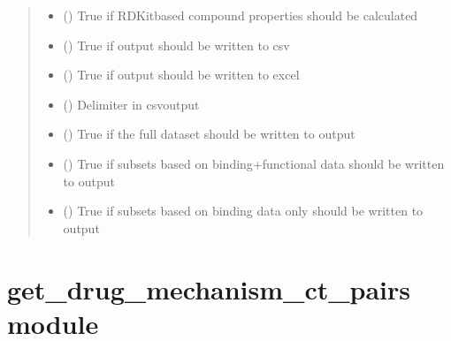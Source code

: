 \documentclass[letterpaper,10pt,english]{sphinxmanual}
\begin{document}
\begin{fulllineitems}
\begin{quote}
\begin{description}
\begin{itemize}
\item {} 
\sphinxAtStartPar
{} () \textendash{} True if RDKit\sphinxhyphen{}based compound properties should be calculated

\item {} 
\sphinxAtStartPar
{} () \textendash{} True if output should be written to csv

\item {} 
\sphinxAtStartPar
{} () \textendash{} True if output should be written to excel

\item {} 
\sphinxAtStartPar
{} () \textendash{} Delimiter in csv\sphinxhyphen{}output

\item {} 
\sphinxAtStartPar
{} () \textendash{} True if the full dataset should be written to output

\item {} 
\sphinxAtStartPar
{} () \textendash{} True if subsets based on binding+functional data should be written to output

\item {} 
\sphinxAtStartPar
{} () \textendash{} True if subsets based on binding data only should be written to output

\end{itemize}

\end{description}\end{quote}

\end{fulllineitems}


\sphinxstepscope


\section{get\_drug\_mechanism\_ct\_pairs module}
\label{\detokenize{get_drug_mechanism_ct_pairs:module-get_drug_mechanism_ct_pairs}}\label{\detokenize{get_drug_mechanism_ct_pairs:get-drug-mechanism-ct-pairs-module}}\label{\detokenize{get_drug_mechanism_ct_pairs::doc}}
\end{document}
